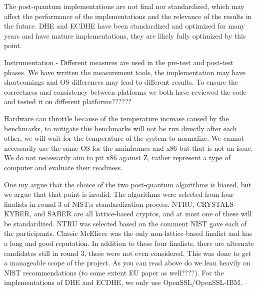 




The post-quantum implementations are not final nor standardized, which may affect the performance of the implementations and the relevance of the results in the future. DHE and ECDHE have been standardized and optimized for many years and have mature implementations, they are likely fully optimized by this point.


Instrumentation - Different measures are used in the pre-test and post-test phases.
We have written the measurement tools, the implementation may have shortcomings and OS differences may lead to different results. To ensure the correctness and consistency between platforms we both have reviewed the code and tested it on different platforms??????



Hardware can throttle because of the temperature increase caused 
by the benchmarks, to mitigate this benchmarks will not be run directly after each other, we will wait for the temperature of the system to normalize.
We cannot necessarily use the same OS for the mainframes and x86 but that is not an issue. We do not necessarily aim to pit x86 against Z, rather represent a type of computer and evaluate their readiness.


One my argue that the choice of the two post-quantum algorithms is biased, but we argue that that point is invalid. The algorithms were selected from four finalists in round 3 of NIST:s standardization process. NTRU, CRYSTALS-KYBER, and SABER are all lattice-based cryptos, and at most one of these will be standardized. NTRU was selected based on the comment NIST gave each of the participants. Classic McEliece was the only non-lattice-based finalist and has a long and good reputation. In addition to these four finalists, there are alternate candidates still in round 3, these were not even considered. This was done to get a manageable scope of the project. As you can read above do we lean heavily on NIST recommendations (to some extent EU paper as well????). For the implementations of DHE and ECDHE, we only use OpenSSL/OpenSSL-IBM.

